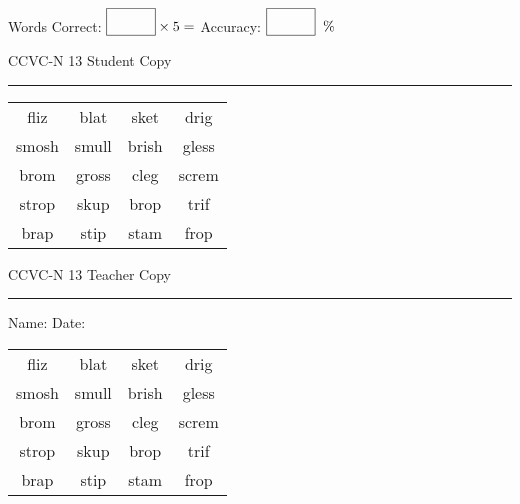 \documentclass{memoir}
\begin{document}
\small

Words Correct: $\fbox{\phantom{\huge 100}} \times 5 = $ Accuracy: $\fbox{\phantom{\huge 100}}\;\; \%$ 

\vfill

\newpage


\footnotesize \noindent
CCVC-N 13 \hfill Student Copy
\smallskip
\hrule

\Large

\setlength{\tabcolsep}{14pt}
\def\arraystretch{3}

{\selectfont


\begin{vplace}[0.5]
\begin{center}
\begin{tabular}{cccc}
fliz & blat & sket & drig        \\
smosh & smull & brish & gless \\
brom          & gross                    & cleg & screm \\
strop & skup & brop   & trif \\
brap               & stip & stam            & frop \\
\end{tabular}
\end{center}
\end{vplace}

}

\newpage

\footnotesize \noindent
CCVC-N 13 \hfill Teacher Copy
\smallskip
\hrule

\small

\vfill

\noindent
Name: \underline{\hspace{1.75in}} \hfill Date: \underline{\hspace{1in}}

\Large

{\selectfont


\begin{vplace}[0.5]
\begin{center}
\begin{tabular}{cccc}
fliz & blat & sket & drig        \\
smosh & smull & brish & gless \\
brom          & gross                    & cleg & screm \\
strop & skup & brop   & trif \\
brap               & stip & stam            & frop \\
\end{tabular}
\end{center}
\end{vplace}



}
\end{document}
